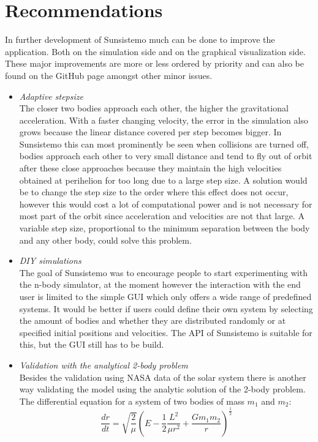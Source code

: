 \documentclass[a4paper]{article}
\begin{document}
\section{Recommendations}
In further development of Sunsistemo much can be done to improve the application. Both on the
simulation side and on the graphical visualization side. These major improvements are more or less
ordered by priority and can also be found on the GitHub page \cite{sunsistemoGH} amongst other minor
issues.

\begin{itemize}
\item \emph{Adaptive stepsize}\\
  The closer two bodies approach each other, the higher the gravitational acceleration. With a
  faster changing velocity, the error in the simulation also grows because the linear distance
  covered per step becomes bigger. In Sunsistemo this can most prominently be seen when collisions
  are turned off, bodies approach each other to very small distance and tend to fly out of orbit
  after these close approaches because they maintain the high velocities obtained at perihelion for
  too long due to a large step size. A solution would be to change the step size to the order where
  this effect does not occur, however this would cost a lot of computational power and is not
  necessary for most part of the orbit since acceleration and velocities are not that large. A
  variable step size, proportional to the minimum separation between the body and any other body,
  could solve this problem.

\item \emph{DIY simulations}\\
  The goal of Sunsistemo was to encourage people to start experimenting with the n-body simulator,
  at the moment however the interaction with the end user is limited to the simple GUI which only
  offers a wide range of predefined systems. It would be better if users could define their own
  system by selecting the amount of bodies and whether they are distributed randomly or at specified
  initial positions and velocities. The API of Sunsistemo is suitable for this, but the GUI still
  has to be build.

\item \emph{Validation with the analytical 2-body problem}\\
  Besides the validation using NASA data of the solar system there is another way validating the
  model using the analytic solution of the 2-body problem. The differential equation for a system of
  two bodies of mass $m_1$ and $m_2$:
\begin{equation}
\label{eq:dtTwoBody}
\frac{dr}{dt} = \sqrt{\frac{2}{\mu}}\left(E-\frac{1}{2}\frac{L^2}{\mu r^2} + \frac{G m_1 m_2}{r}\right)^{\frac{1}{2}}
\end{equation}


\end{itemize}
\end{document}

